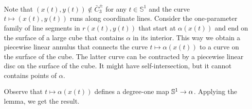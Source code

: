 Note that $(x(t),y(t))\notin \bar C_3^\pm$ for any $t\in \mathbb{S}^1$ and the curve $t\mapsto(x(t),y(t))$ runs along coordinate lines.
Consider the one-parameter family of line segments in $r(x(t),y(t))$ that start at $\alpha(x(t))$ and end on the surface of a large cube that contains $\alpha$ in its interior.
This way we obtain a piecewise linear annulus that connects the curve $t\mapsto \alpha(x(t))$ to a curve on the surface of the cube.
The latter curve can be contracted by a piecewise linear disc on the surface of the cube.
It might have self-intersection, but it cannot contains points of $\alpha$.

Observe that $t\mapsto \alpha(x(t))$ defines a degree-one map $\mathbb{S}^1\z\to\alpha$.
Applying the lemma, we get the result.
\qeds





